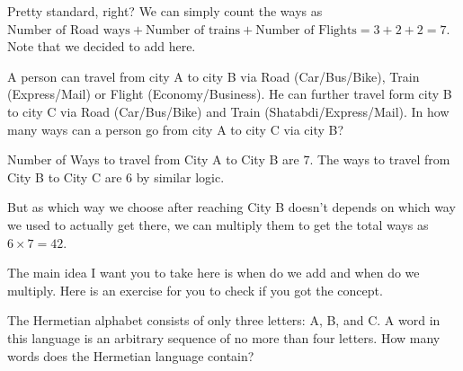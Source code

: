 Pretty standard, right? We can simply count the ways as $\text{Number of Road ways}
+\text{Number of trains}+\text{Number of Flights}=3+2+2=7$. Note that we decided to add here.
\begin{example}
    A person can travel from city A to city B via Road (Car/Bus/Bike), Train (Express/Mail) or
     Flight (Economy/Business). He can further travel form city B to city C via Road (Car/Bus/Bike) 
     and Train (Shatabdi/Express/Mail). In how many ways can a person go from city A to city C via city B?
\end{example}
Number of Ways to travel from City A to City B are $7$. The ways to travel from City B to City C are 
$6$ by similar logic.\par
But as which way we choose after reaching City B doesn't depends on which way we used to actually get 
there, we can multiply them to get the total ways as $6 \times 7=42$.\par
The main idea I want you to take here is when do we add and when do we multiply. Here is an exercise 
for you to check if you got the concept.
\begin{example}
The Hermetian alphabet consists of only three letters: A, B, and C. 
A word in this language is an arbitrary sequence of no more than four letters. 
How many words does the Hermetian language contain?
\end{example}
